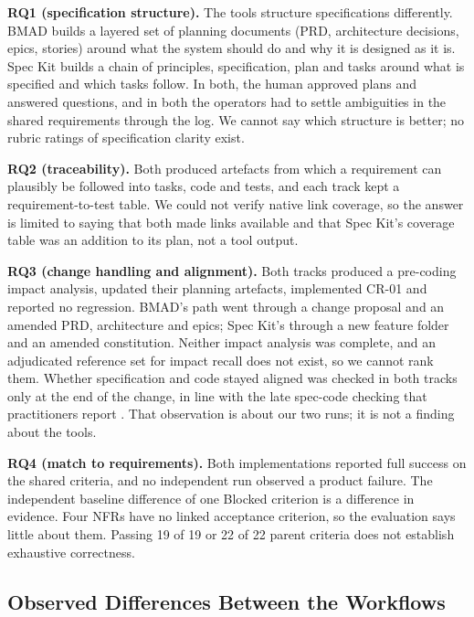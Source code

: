 \documentclass[conference]{IEEEtran}
\begin{document}
\textbf{RQ1 (specification structure).} The tools structure
specifications differently. BMAD builds a layered set of planning
documents (PRD, architecture decisions, epics, stories) around what the
system should do and why it is designed as it is. Spec Kit builds a
chain of principles, specification, plan and tasks around what is
specified and which tasks follow. In both, the human approved plans and
answered questions, and in both the operators had to settle ambiguities
in the shared requirements through the log. We cannot say which
structure is better; no rubric ratings of specification clarity exist.

\textbf{RQ2 (traceability).} Both produced artefacts from which a
requirement can plausibly be followed into tasks, code and tests, and
each track kept a requirement-to-test table. We could not verify native
link coverage, so the answer is limited to saying that both made links
available and that Spec Kit's coverage table was an addition to its
plan, not a tool output.

\textbf{RQ3 (change handling and alignment).} Both tracks produced a
pre-coding impact analysis, updated their planning artefacts,
implemented CR-01 and reported no regression. BMAD's path went through a
change proposal and an amended PRD, architecture and epics; Spec Kit's
through a new feature folder and an amended constitution. Neither impact
analysis was complete, and an adjudicated reference set for impact
recall does not exist, so we cannot rank them. Whether specification and
code stayed aligned was checked in both tracks only at the end of the
change, in line with the late spec-code checking that practitioners
report \cite{agarwal2026}. That observation is about our two runs; it
is not a finding about the tools.

\textbf{RQ4 (match to requirements).} Both implementations reported full
success on the shared criteria, and no independent run observed a
product failure. The independent baseline difference of one Blocked
criterion is a difference in evidence. Four NFRs have no linked
acceptance criterion, so the evaluation says little about them. Passing
19 of 19 or 22 of 22 parent criteria does not establish exhaustive
correctness.

\subsection{Observed Differences Between the
Workflows}\label{observed-differences-between-the-workflows}
\end{document}
